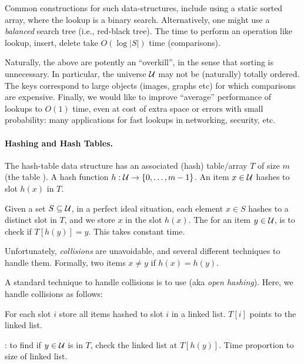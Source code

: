 \bigskip%

Common constructions for such data-structures, include using a static
sorted array, where the lookup is a binary search. Alternatively, one
might use a \emph{balanced} search tree (i.e., red-black tree). The
time to perform an operation like lookup, insert, delete take
$O(\log |S|)$ time (comparisons).

Naturally, the above are potently an ``overkill'', in the sense that
sorting is unnecessary. In particular, the universe $\mathcal{U}$ may not be
(naturally) totally ordered.  The keys correspond to large objects
(images, graphs etc) for which comparisons are expensive.  Finally, we
would like to improve ``average'' performance of lookups to $O(1)$
time, even at cost of extra space or errors with small probability:
many applications for fast lookups in networking, security, etc.


\paragraph*{Hashing and Hash Tables.}%

The hash-table data structure has an associated (hash) table/array $T$
of size $m$ (the table ).  A hash function
$h: \mathcal{U} \rightarrow \{0,\ldots,m-1\}$. An item $x \in \mathcal{U}$ hashes to
slot $h(x)$ in $T$.


Given a set $S \subseteq \mathcal{U}$, in a perfect ideal situation, each
element $x \in S$ hashes to a distinct slot in $T$, and we store $x$
in the slot $h(x)$. The  for an item $y \in \mathcal{U}$, is
to check if $T[h(y)] = y$. This takes constant time.

Unfortunately, \emph{collisions} are unavoidable, and several
different techniques to handle them.
Formally, two items $x \neq y$   if  $h(x) = h(y)$.

A standard technique to handle collisions is to use 
(aka \emph{open hashing}). Here, we handle collisions as follows:
\smallskip%
\begin{compactenumA}
    \item For each slot $i$ store all items hashed to slot $i$ in a
    linked list. $T[i]$ points to the linked list.
    
    \smallskip%
    \item {}: to find if $y \in \mathcal{U}$ is in $T$, check
    the linked list at $T[h(y)]$. Time proportion to size of linked
    list.
\end{compactenumA}


